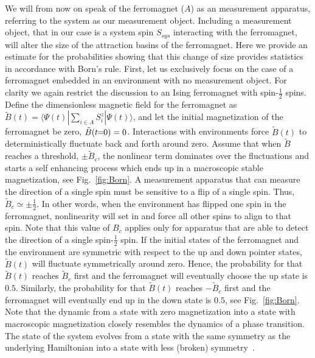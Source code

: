 \documentclass[showpacs,preprintnumbers,amsmath,amssymb,12pt]{revtex4-2}
\begin{document}
We will from now on speak of the ferromagnet ($A$) as an measurement
apparatus, referring to the system as our measurement object.
Including a measurement object, that in our case is a system spin
$S_{sys}$ interacting with the ferromagnet, will alter the size of the
attraction basins of the ferromagnet. Here we provide an estimate for
the probabilities showing that this change of size provides statistics
in accordance with Born's rule. First, let us exclusively focus on the
case of a ferromagnet embedded in an environment with no measurement
object. For clarity we again restrict the discussion to an Ising
ferromagnet with spin-$\frac{1}{2}$ spins.  Define the dimensionless
magnetic field for the ferromagnet as $\tilde{B}(t) = \langle \Psi(t)
| \sum_{i \in A} S_i^z | \Psi(t) \rangle$, and let the initial
magnetization of the ferromagnet be zero, $\tilde{B}(t \!\! = \!\! 0) =
0$. Interactions with environments force $\tilde{B}(t)$ to
deterministically fluctuate back and forth around zero. Assume that
when $\tilde{B}$ reaches a threshold, $\pm \tilde{B}_c$, the nonlinear
term dominates over the fluctuations and starts a self enhancing
process which ends up in a macroscopic stable magnetization, see
Fig.~\ref{fig:Born}. A measurement apparatus that can measure the
direction of a single spin must be sensitive to a flip of a single
spin. Thus, $\tilde{B}_c \simeq \pm \frac{1}{2}$. In other words, when
the environment has flipped one spin in the ferromagnet, nonlinearity
will set in and force all other spins to align to that spin. Note that
this value of $B_c$ applies only for apparatus that are able to detect
the direction of a single spin-$\frac{1}{2}$ spin. If the initial
states of the ferromagnet and the environment are symmetric with
respect to the up and down pointer states, $\tilde{B}(t)$ will
fluctuate symmetrically around zero. Hence, the probability for that
$\tilde{B}(t)$ reaches $\tilde{B}_c$ first and the ferromagnet will
eventually choose the up state is $0.5$. Similarly, the probability
for that $\tilde{B}(t)$ reaches $-\tilde{B}_c$ first and the
ferromagnet will eventually end up in the down state is $0.5$, see
Fig.~\ref{fig:Born}. Note that the dynamic from a state with zero
magnetization into a state with macroscopic magnetization closely
resembles the dynamics of a phase transition. The state of the system
evolves from a state with the same symmetry as the underlying
Hamiltonian into a state with less (broken)
symmetry~\cite{Anderson:Science72}.
\end{document}
